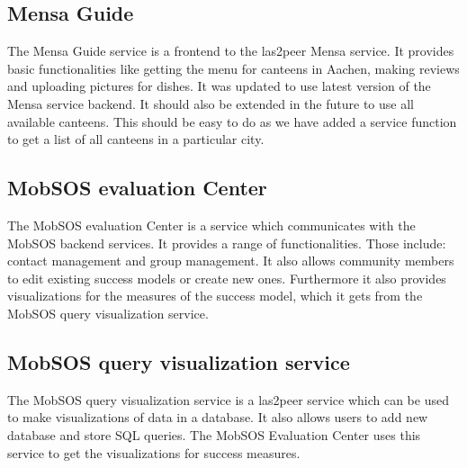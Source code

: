 \subsection{Mensa Guide}
The Mensa Guide service is a frontend to the las2peer Mensa service. It provides basic functionalities like getting the menu for canteens in Aachen, making reviews and uploading pictures for dishes. It was updated to use latest version of the Mensa service backend. It should also be extended in the future to use all available canteens. This should be easy to do as we have added a service function to get a list of all canteens in a particular city.

\subsection{MobSOS evaluation Center}
The MobSOS evaluation Center is a service which communicates with the MobSOS backend services. It provides a range of functionalities. Those include: contact management and group management. 
It also allows community members to edit existing success models or create new ones.
Furthermore it also provides visualizations for the measures of the success model, which it gets from the MobSOS query visualization service.

\subsection{MobSOS query visualization service}
The MobSOS query visualization service is a las2peer service which can be used to make visualizations of data in a database. It also allows users to add new database and store SQL queries. The MobSOS Evaluation Center uses this service to get the visualizations for success measures.










